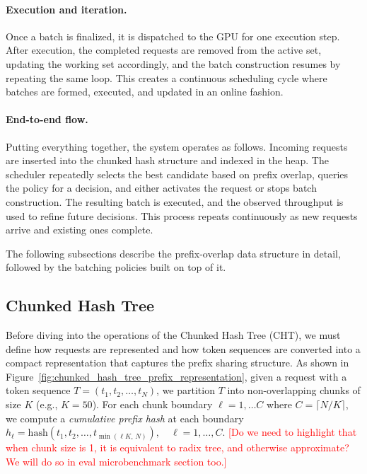 \paragraph{Execution and iteration.}
Once a batch is finalized, it is dispatched to the GPU for one execution step. After execution, the completed requests are removed from the active set, updating the working set accordingly, and the batch construction resumes by repeating the same loop. This creates a continuous scheduling cycle where batches are formed, executed, and updated in an online fashion.

\paragraph{End-to-end flow.}
Putting everything together, the system operates as follows. Incoming requests are inserted into the chunked hash structure and indexed in the heap. The scheduler repeatedly selects the best candidate based on prefix overlap, queries the policy for a decision, and either activates the request or stops batch construction. The resulting batch is executed, and the observed throughput is used to refine future decisions. This process repeats continuously as new requests arrive and existing ones complete.

The following subsections describe the prefix-overlap data structure in detail, followed by the batching policies built on top of it.

\subsection{Chunked Hash Tree}

Before diving into the operations of the Chunked Hash Tree (CHT), we must define how requests are represented and how token sequences are converted into a compact representation that captures the prefix sharing structure. As shown in Figure~\ref{fig:chunked_hash_tree_prefix_representation}, given a request with a token sequence $T = (t_1, t_2, \dots, t_N)$, we partition $T$ into non-overlapping chunks of size $K$ (e.g., $K = 50$). For each chunk boundary $\ell = 1, \dots C$ where $C = \lceil N/K \rceil$, we compute a \emph{cumulative prefix hash} at each boundary\\ $h_\ell = \mathrm{hash}(t_1, t_2, \dots, t_{\min(\ell K,\, N)}), \quad \ell = 1, \dots, C$. \textcolor{red}{[Do we need to highlight that when chunk size is 1, it is equivalent to radix tree, and otherwise approximate? We will do so in eval microbenchmark section too.]}

